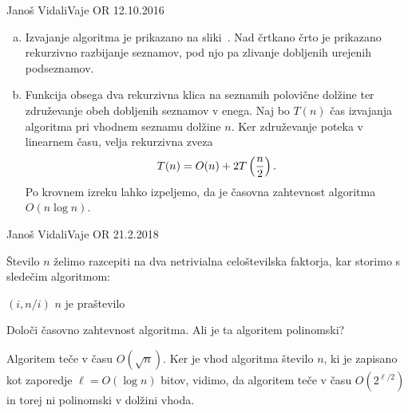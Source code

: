 \begin{naloga}{Janoš Vidali}{Vaje OR 12.10.2016}
\begin{odgovor}
\begin{enumerate}[(a)]
\item Izvajanje algoritma je prikazano na sliki~\fig{}.
Nad črtkano črto je prikazano rekurzivno razbijanje seznamov,
pod njo pa zlivanje dobljenih urejenih podseznamov.

\item Funkcija obsega dva rekurzivna klica na seznamih polovične dolžine
ter združevanje obeh dobljenih seznamov v enega.
Naj bo $T(n)$ čas izvajanja algoritma pri vhodnem seznamu dolžine $n$.
Ker združevanje poteka v linearnem času, velja rekurzivna zveza
$$
T(n) = O(n) + 2T\left({n \over 2}\right) .
$$
Po krovnem izreku lahko izpeljemo,
da je časovna zahtevnost algoritma $O(n \log n)$.
\end{enumerate}

\begin{slika}
\pgfslika
{}
\end{slika}
\end{odgovor}
\end{naloga}


\begin{naloga}{Janoš Vidali}{Vaje OR 21.2.2018}
\begin{vprasanje}
Število $n$ želimo razcepiti
na dva netrivialna celoštevilska faktorja,
kar storimo s sledečim algoritmom:
\begin{small}
\begin{algorithmic}
            \State \Return $(i, n/i)$
        \EndIf
    \EndFor
    \State \Return $n$ je praštevilo
\EndFunction
\end{algorithmic}
\end{small}
Določi časovno zahtevnost algoritma.
Ali je ta algoritem polinomski?
\end{vprasanje}

\begin{odgovor}
Algoritem teče v času $O(\sqrt{n})$.
Ker je vhod algoritma število $n$,
ki je zapisano kot zaporedje $\ell = O(\log n)$ bitov,
vidimo, da algoritem teče v času $O(2^{\ell/2})$
in torej ni polinomski v dolžini vhoda.
\end{odgovor}
\end{naloga}


